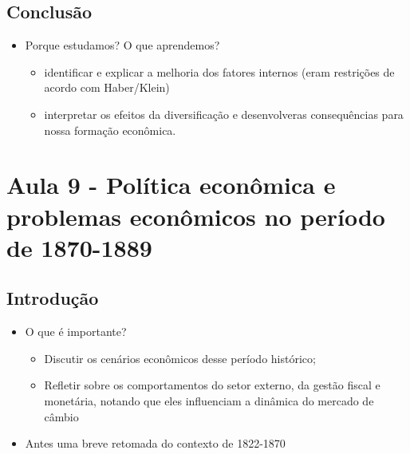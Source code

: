 \documentclass[a4paper,12pt]{article}[abntex2]
\begin{document}
\subsection{\textbf{Conclusão}}

\begin{itemize}
    \item Porque estudamos? O que aprendemos?
    \begin{itemize}
        \item  identificar e explicar a melhoria dos fatores internos (eram restrições de acordo com Haber/Klein)
    \end{itemize}
    \begin{itemize}
        \item  interpretar os efeitos da diversificação e desenvolveras consequências para nossa formação econômica.
    \end{itemize}
\end{itemize}
\newpage

\section{\textbf{Aula 9 - Política econômica e problemas econômicos no período de 1870-1889}}
\subsection{\textbf{Introdução}}
\begin{itemize}
    \item O que é importante?
    \begin{itemize}
        \item Discutir os cenários econômicos desse período histórico;
    \end{itemize}
    \begin{itemize}
        \item Refletir sobre os comportamentos do setor externo, da gestão fiscal e monetária, notando que eles influenciam a dinâmica do mercado de câmbio
    \end{itemize}
    \item Antes uma breve retomada do contexto de 1822-1870
\end{itemize}
\end{document}
